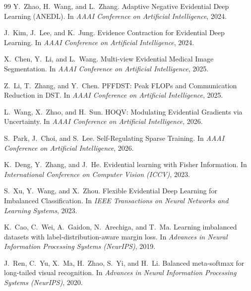 \documentclass[letterpaper]{article} %
\begin{document}
\begin{thebibliography}{99}
Y.~Zhao, H.~Wang, and L.~Zhang.
\newblock Adaptive Negative Evidential Deep Learning (ANEDL).
\newblock In {\em AAAI Conference on Artificial Intelligence}, 2024.

J.~Kim, J.~Lee, and K.~Jung.
\newblock Evidence Contraction for Evidential Deep Learning.
\newblock In {\em AAAI Conference on Artificial Intelligence}, 2024.

X.~Chen, Y.~Li, and L.~Wang.
\newblock Multi-view Evidential Medical Image Segmentation.
\newblock In {\em AAAI Conference on Artificial Intelligence}, 2025.

Z.~Li, T.~Zhang, and Y.~Chen.
\newblock PFFDST: Peak FLOPs and Communication Reduction in DST.
\newblock In {\em AAAI Conference on Artificial Intelligence}, 2025.

L.~Wang, X.~Zhao, and H.~Sun.
\newblock HOQV: Modulating Evidential Gradients via Uncertainty.
\newblock In {\em AAAI Conference on Artificial Intelligence}, 2026.

S.~Park, J.~Choi, and S.~Lee.
\newblock Self-Regulating Sparse Training.
\newblock In {\em AAAI Conference on Artificial Intelligence}, 2026.

K.~Deng, Y.~Zhang, and J.~He.
\newblock Evidential learning with Fisher Information.
\newblock In {\em International Conference on Computer Vision (ICCV)}, 2023.

S.~Xu, Y.~Wang, and X.~Zhou.
\newblock Flexible Evidential Deep Learning for Imbalanced Classification.
\newblock In {\em IEEE Transactions on Neural Networks and Learning Systems}, 2023.


K.~Cao, C.~Wei, A.~Gaidon, N.~Arechiga, and T.~Ma.
\newblock Learning imbalanced datasets with label-distribution-aware margin loss.
\newblock In {\em Advances in Neural Information Processing Systems (NeurIPS)}, 2019.

J.~Ren, C.~Yu, X.~Ma, H.~Zhao, S.~Yi, and H.~Li.
\newblock Balanced meta-softmax for long-tailed visual recognition.
\newblock In {\em Advances in Neural Information Processing Systems (NeurIPS)}, 2020.


\end{thebibliography}
\end{document}
